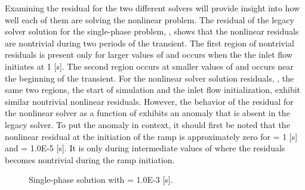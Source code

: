 Examining the residual for the two different solvers will provide insight into how well each of them are solving the nonlinear problem.
The residual of the legacy solver solution for the single-phase problem, , shows that the nonlinear residuals are nontrivial during two periods of the transient.
The first region of nontrivial residuals is present only for larger values of \dtmax{} and occurs when the the inlet flow initiates at 1 [s].
The second region occurs at smaller values of \dtmax{} and occurs near the beginning of the transient.
For the nonlinear solver solution residuals, , the same two regions, the start of simulation and the inlet flow initialization, exhibit similar nontrivial nonlinear residuals.
However, the behavior of the residual for the nonlinear solver as a function of \dtmax{} exhibits an anomaly that is absent in the legacy solver.
To put the anomaly in context, it should first be noted that the nonlinear residual at the initiation of the ramp is approximately zero for \dtmax{} = 1 [s] and \dtmax{} = 1.0E-5 [s].
It is only during intermediate values of \dtmax{} where the residuals becomes nontrivial during the ramp initiation.

\begin{figure}[h!t]
\centering
{}
\caption[Single-phase solution at \dtmax{} = 1.0E-3 {[s]}]{Single-phase solution with \dtmax{} = 1.0E-3 {[s]}.}
\label{fig:single_compare_3}
\end{figure}

